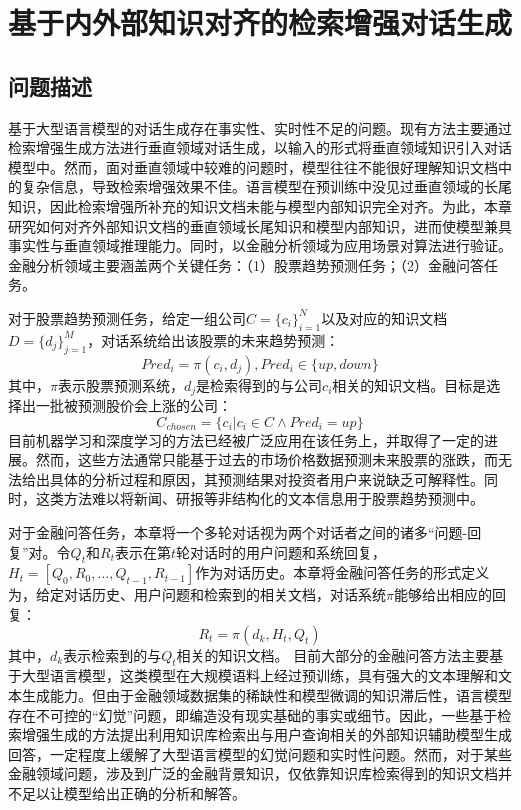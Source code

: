 \chapter{基于内外部知识对齐的检索增强对话生成}

\section{问题描述}

基于大型语言模型的对话生成存在事实性、实时性不足的问题。现有方法主要通过检索增强生成方法进行垂直领域对话生成，以输入的形式将垂直领域知识引入对话模型中。然而，面对垂直领域中较难的问题时，模型往往不能很好理解知识文档中的复杂信息，导致检索增强效果不佳。语言模型在预训练中没见过垂直领域的长尾知识，因此检索增强所补充的知识文档未能与模型内部知识完全对齐。为此，本章研究如何对齐外部知识文档的垂直领域长尾知识和模型内部知识，进而使模型兼具事实性与垂直领域推理能力。同时，以金融分析领域为应用场景对算法进行验证。金融分析领域主要涵盖两个关键任务：（1）股票趋势预测任务；（2）金融问答任务。

对于股票趋势预测任务，给定一组公司$C=\{c_i\}_{i=1}^N$以及对应的知识文档$D=\{d_j\}_{j=1}^M$，对话系统给出该股票的未来趋势预测：
\begin{equation}
	Pred_i=\pi(c_i, d_j), Pred_i \in \{up, down\}
\end{equation}
其中，$\pi$表示股票预测系统，$d_j$是检索得到的与公司$c_i$相关的知识文档。目标是选择出一批被预测股价会上涨的公司：
\begin{equation}
	C_{chosen} = \{c_i | c_i \in C \land Pred_i = up\}
\end{equation}
目前机器学习和深度学习的方法已经被广泛应用在该任务上，并取得了一定的进展\cite{RJXB20240320003,RJXB201903021}。然而，这些方法通常只能基于过去的市场价格数据预测未来股票的涨跌，而无法给出具体的分析过程和原因，其预测结果对投资者用户来说缺乏可解释性。同时，这类方法难以将新闻、研报等非结构化的文本信息用于股票趋势预测中。

对于金融问答任务，本章将一个多轮对话视为两个对话者之间的诸多“问题-回复”对。令$Q_t$和$R_t$表示在第$t$轮对话时的用户问题和系统回复，$H_t=[Q_0, R_0, …, Q_{t-1}, R_{t-1}]$作为对话历史。本章将金融问答任务的形式定义为，给定对话历史、用户问题和检索到的相关文档，对话系统$\pi$能够给出相应的回复：
\begin{equation}
	R_t = \pi(d_k, H_t, Q_t)
\end{equation}
其中，$d_k$表示检索到的与$Q_t$相关的知识文档。
目前大部分的金融问答方法主要基于大型语言模型，这类模型在大规模语料上经过预训练，具有强大的文本理解和文本生成能力。但由于金融领域数据集的稀缺性和模型微调的知识滞后性，语言模型存在不可控的“幻觉”问题，即编造没有现实基础的事实或细节。因此，一些基于检索增强生成的方法提出利用知识库检索出与用户查询相关的外部知识辅助模型生成回答，一定程度上缓解了大型语言模型的幻觉问题和实时性问题。然而，对于某些金融领域问题，涉及到广泛的金融背景知识，仅依靠知识库检索得到的知识文档并不足以让模型给出正确的分析和解答。


